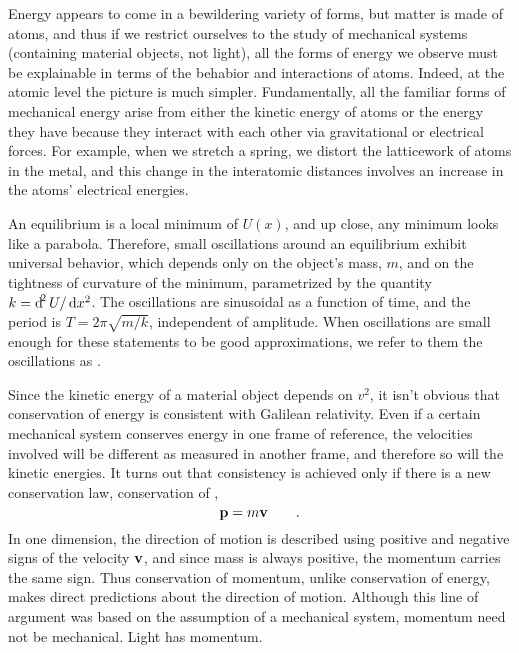 	Energy appears to come in a bewildering variety of forms, but matter is made of
	atoms, and thus if we restrict ourselves to the study of mechanical systems
	(containing material objects, not light), all the forms of energy we observe
	must be explainable in terms of the behabior and interactions of atoms. Indeed,
	at the atomic level the picture is much simpler. Fundamentally, all the familiar forms of
	mechanical energy arise from either the kinetic energy of atoms or the energy
	they have because they interact with each other via gravitational or electrical
	forces. For example, when we stretch a spring, we distort the latticework of
	atoms in the metal, and this change in the interatomic distances involves an
	increase in the atoms' electrical energies.
	
	An equilibrium is a local minimum of $U(x)$, and up close, any minimum
	looks like a parabola. Therefore, small oscillations around
	an equilibrium exhibit universal behavior, which depends only on the object's
	mass, $m$, and on the tightness of curvature of the minimum, parametrized
	by the quantity $k=\operatorname{d\!}^2U/\operatorname{d\!} x^2$. The oscillations are sinusoidal
	as a function of time, and the period is $T=2\pi\sqrt{m/k}$, independent
	of amplitude. When oscillations are small enough for these statements to
	be good approximations, we refer to them the oscillations as
	.
	
	Since the kinetic energy of a material object depends on $v^2$, it isn't obvious
	that conservation of energy is consistent with Galilean relativity. Even if
	a certain mechanical system conserves energy in one frame of reference, the
	velocities involved will be different as measured in another frame, and therefore
	so will the kinetic energies. It turns out that consistency is achieved only
	if there is a new conservation law, conservation of ,
	\begin{equation*}
		\mathbf{p} = m\mathbf{v} \qquad .
	\end{equation*}
	In one dimension, the direction of motion is described using positive and negative
	signs of the velocity $\mathbf{v}$, and since mass is always positive, the momentum
	carries the same sign. Thus conservation of momentum, unlike conservation of
	energy, makes direct predictions about the direction of motion.
	Although this line of argument was based on the assumption of a mechanical
	system, momentum need not be mechanical. Light has momentum.
	
